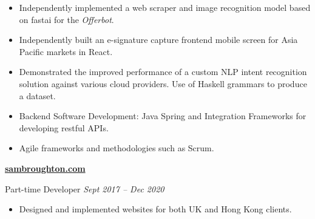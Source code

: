 \documentclass[10pt]{article} %
\begin{document}
\begin{changemargin}{0pt}{0.5pt}
\begin{minipage}[t]{0.5\textwidth}
\begin{changemargin}{1pt}{1pt}
\begin{itemize} \itemsep-2pt %
  \item Independently implemented a web scraper and image recognition model based on fastai for the \textit{Offerbot}.
  \item Independently built an e-signature capture frontend mobile screen for Asia Pacific markets in React.
  \item Demonstrated the improved performance of a custom NLP intent recognition solution against various cloud providers. Use of Haskell grammars to produce a dataset.
  \item Backend Software Development: Java Spring and Integration Frameworks for developing restful APIs.
  \item Agile frameworks and methodologies such as Scrum.
\end{itemize}


\vspace{5pt}
\underline{\textbf{sambroughton.com}}\\
\par
\vspace{-10pt}
Part-time Developer \textit{\hfill Sept 2017 -- Dec 2020}\\
\vspace{-15pt}

\begin{itemize} \itemsep-2pt %
  \item Designed and implemented websites for both UK and Hong Kong clients.  
\end{itemize}


\end{changemargin}
\end{minipage} %
\hfill
\begin{minipage}[t]{0.44\textwidth} %
\vspace{0pt} %



\end{minipage}
\end{changemargin}
\end{document}

